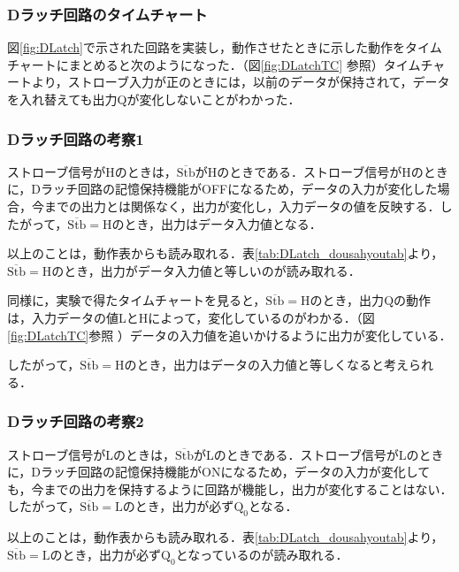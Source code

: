 %
%
\subsubsection{Dラッチ回路のタイムチャート}
\label{DLatch_timechart}
図\ref{fig:DLatch}で示された回路を実装し，動作させたときに示した動作をタイムチャートにまとめると次のようになった．（図\ref{fig:DLatchTC} 参照）タイムチャートより，ストローブ入力が正のときには，以前のデータが保持されて，データを入れ替えても出力Qが変化しないことがわかった．

%
%
\subsubsection{Dラッチ回路の考察1}
\label{DLatch_consideration1}
ストローブ信号がHのときは，$\overline{\mathrm{Stb}}$がHのときである．ストローブ信号がHのときに，Dラッチ回路の記憶保持機能がOFFになるため，データの入力が変化した場合，今までの出力とは関係なく，出力が変化し，入力データの値を反映する．したがって，$\overline{\mathrm{Stb}}=\mathrm{H}$のとき，出力はデータ入力値となる．

以上のことは，動作表からも読み取れる．表\ref{tab:DLatch_dousahyoutab}より，$\overline{\mathrm{Stb}}=\mathrm{H}$のとき，出力がデータ入力値と等しいのが読み取れる．

同様に，実験で得たタイムチャートを見ると，$\overline{\mathrm{Stb}}=\mathrm{H}$のとき，出力$\mathrm{Q}$の動作は，入力データの値LとHによって，変化しているのがわかる．（図\ref{fig:DLatchTC}参照 ）データの入力値を追いかけるように出力が変化している．

したがって，$\overline{\mathrm{Stb}}=\mathrm{H}$のとき，出力はデータの入力値と等しくなると考えられる．

%
%
\subsubsection{Dラッチ回路の考察2}
\label{DLatch_consideration2}
ストローブ信号がLのときは，$\overline{\mathrm{Stb}}$がLのときである．ストローブ信号がLのときに，Dラッチ回路の記憶保持機能がONになるため，データの入力が変化しても，今までの出力を保持するように回路が機能し，出力が変化することはない．したがって，$\overline{\mathrm{Stb}}=\mathrm{L}$のとき，出力が必ず$\mathrm{Q_0}$となる．

以上のことは，動作表からも読み取れる．表\ref{tab:DLatch_dousahyoutab}より，$\overline{\mathrm{Stb}}=\mathrm{L}$のとき，出力が必ず$\mathrm{Q_0}$となっているのが読み取れる．

